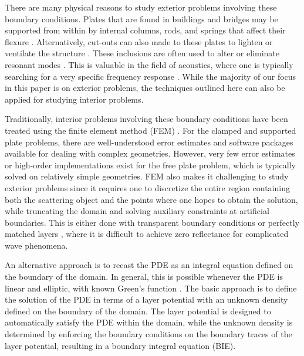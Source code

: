 \documentclass[preprint,12pt,3p]{elsarticle}
\begin{document}
There are many physical reasons to study exterior problems involving these boundary conditions. Plates that are found in buildings and bridges may be supported from within by internal columns, rods, and springs that affect their flexure \cite{zhao2002plate}. Alternatively, cut-outs can also made to these plates to lighten or ventilate the structure \cite{RAJAMANI1977549, HUANG1999769}. These inclusions are often used to alter or eliminate resonant modes \cite{PhysRevB.73.064301, Lindsay2018}. This is valuable in the field of acoustics, where one is typically searching for a very specific frequency response \cite{ ZHU2024108814, laulagnet1998sound}. While the majority of our focus in this paper is on exterior problems, the techniques outlined here can also be applied for studying interior problems.

Traditionally, interior problems involving these boundary conditions have been treated using the finite element method (FEM) \cite{ monk87, climente2014gradient, mora2009piecewise, meylan2002}. For the clamped and supported plate problems, there are well-understood error estimates \cite{ishihara78, BRAMBLE1983} and software packages available for dealing with complex geometries. However, very few error estimates or high-order implementations exist for the free plate problem, which is typically solved on relatively simple geometries. FEM also makes it challenging to study exterior problems since it requires one to discretize the entire region containing both the scattering object and the points where one hopes to obtain the solution, while truncating the domain and solving auxiliary constraints at artificial boundaries.  This is either done with transparent boundary conditions \cite{YUE2023100350, YUE2024112606} or perfectly matched layers \cite{FARHAT20112237}, where it is difficult to achieve zero reflectance for complicated wave phenomena. 

An alternative approach is to recast the PDE as an integral equation defined on the boundary of the domain. 
In general, this is possible whenever the PDE is linear and elliptic, with known Green's function \cite{Atkinson_1997}. 
The basic approach is to define the solution of the PDE in terms of a layer potential with an unknown density
defined on the boundary of the domain. The layer potential is designed to automatically 
satisfy the PDE within the domain, while the unknown density is determined by enforcing the boundary conditions on the
boundary traces of the layer potential, resulting in a boundary integral equation (BIE).
\end{document}
